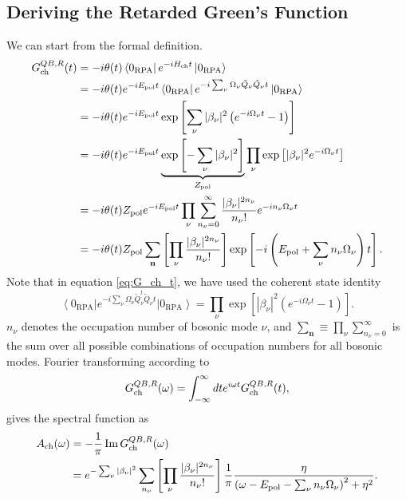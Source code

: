 \subsection{Deriving the Retarded Green's Function }
We can start from the formal definition.  
\begin{align}
G^{QB,R}_{\rm ch}(t)
&=
-i \theta(t)
\left\langle 0_{\rm RPA} \right|
e^{-i H_{\rm ch} t}
\left|0_{\rm RPA}\right\rangle
\\
&=-i \theta(t) e^{-i E_{\mathrm{pol}} t}\left\langle 0_{\mathrm{RPA}}\right| e^{-i \sum_\nu \Omega_\nu \tilde{Q}_\nu \tilde{Q}_\nu t}\left|0_{\mathrm{RPA}}\right\rangle \label{eq:G_ch_t} \\
&=
-i \theta(t)
e^{-i E_{\rm pol} t}
\exp
\left[
\sum_{\nu}
|\beta_{\nu}|^2
\left(
e^{-i \Omega_{\nu} t}
-
1
\right)
\right]
\\
&=
-i \theta(t)
e^{-i E_{\rm pol} t}
\underbrace{
\exp
\left[
-\sum_{\nu} |\beta_{\nu}|^2
\right]
}_{Z_{\rm pol}}
\prod_{\nu}
\exp
\left[
|\beta_{\nu}|^2 e^{-i\Omega_{\nu} t}
\right]
\\
&=
-i \theta(t)
Z_{\rm pol}
e^{-i E_{\rm pol} t}
\prod_{\nu}
\sum_{n_{\nu}=0}^{\infty}
\frac{
|\beta_{\nu}|^{2n_{\nu}}
}{
n_{\nu}!
}
e^{-i n_{\nu} \Omega_{\nu} t}
\\
&=
-i \theta(t)
Z_{\rm pol}
\sum_{\mathbf n}
\left[
\prod_{\nu}
\frac{
|\beta_{\nu}|^{2n_{\nu}}
}{
n_{\nu}!
}
\right]
\exp
\left[
-i
\left(
E_{\rm pol}
+
\sum_{\nu} n_{\nu}\Omega_{\nu}
\right)t
\right].
\end{align}
Note that in equation \eqref{eq:G_ch_t}, we have used the coherent state identity
\begin{equation}
    \left\langle 0_{\mathrm{RPA}}\right| e^{-i \sum_\nu \Omega_\nu \tilde{Q}_\nu^t \tilde{Q}_\nu t}\left|0_{\mathrm{RPA}}\right\rangle=\prod_\nu \exp \left[\left|\beta_\nu\right|^2\left(e^{-i \Omega_\nu t}-1\right)\right] .
\end{equation}
$n_{\nu}$ denotes the occupation number of bosonic mode \(\nu\), and $\sum_{\mathbf n} \equiv \prod_{\nu} \sum_{n_{\nu}=0}^{\infty}$ is the sum over all possible combinations of occupation numbers for all bosonic modes. Fourier transforming according to
\begin{equation}
G^{QB,R}_{\rm ch}(\omega)
=
\int_{-\infty}^{\infty}
dt
e^{i\omega t}
G^{QB,R}_{\rm ch}(t),
\end{equation}
gives the spectral function as
\begin{align}
A_{\rm ch}(\omega)
&=
-\frac{1}{\pi}
\operatorname{Im}
G_{\rm ch}^{QB,R}(\omega)\\
&=
e^{-\sum_\nu |\beta_\nu|^2}
\sum_{{n_\nu}}
\left[
\prod_\nu
\frac{
|\beta_\nu|^{2n_\nu}
}{
n_\nu!
}
\right]
\frac{1}{\pi}
\frac{
\eta
}{
\left(
\omega
-
E_{\rm pol}
-
\sum_\nu n_\nu \Omega_\nu
\right)^2
+
\eta^2
} .
\label{eq}
\end{align}
